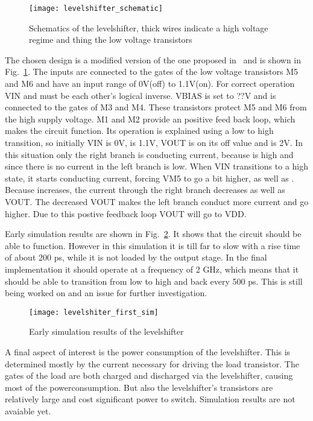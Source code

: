 \begin{figure}[h]
 \texttt{[image: levelshifter\_schematic]}
 \caption{Schematics of the levelshifter, thick wires indicate a high voltage regime and thing the low voltage transistors}
 \label{fig:schematic_levelshifter}
\end{figure}
The chosen design is a modified version of the one proposed in~\cite{powerdac} and is shown in Fig.~\ref{fig:schematic_levelshifter}. The inputs are connected to the gates of the low voltage transistors M5 and M6 and have an input range of 0V(off) to 1.1V(on). For correct operation VIN and  must be each other's logical inverse. VBIAS is set to ??V and is connected to the gates of M3 and M4. These transistors protect M5 and M6 from the high supply voltage. M1 and M2 provide an positive feed back loop, which makes the circuit function. Its operation is explained using a low to high transition, so initially VIN is 0V,  is 1.1V, VOUT is on its off value and  is 2V. In this situation only the right branch is conducting current, because  is high and since there is no current in the left branch  is low. When VIN transitions to a high state, it starts conducting current, forcing VM5 to go a bit higher, as well as . Because  increases, the current through the right branch decreases as well as VOUT. The decreased VOUT makes the left branch conduct more current and  go higher. Due to this postive feedback loop VOUT will go to VDD.

Early simulation results are shown in Fig.~\ref{fig:levelshifter_first_sim}. It shows that the circuit should be able to function. However in this simulation it is till far to slow with a rise time of about 200 ps, while it is not loaded by the output stage. In the final implementation it should operate at a frequency of 2 GHz, which means that it should be able to transition from low to high and back every 500 ps. This is still being worked on and an issue for further investigation.
\begin{figure}[h]
 \texttt{[image: levelshiter\_first\_sim]}
 \caption{Early simulation results of the levelshifter}
 \label{fig:levelshifter_first_sim}
\end{figure}

A final aspect of interest is the power consumption of the levelshifter. This is determined mostly by the current necessary for driving the load transistor. The gates of the load are both charged and discharged via the levelshifter, causing most of the powerconsumption. But also the levelshifter's transistors are relatively large and cost significant power to switch. Simulation results are not avaiable yet. 